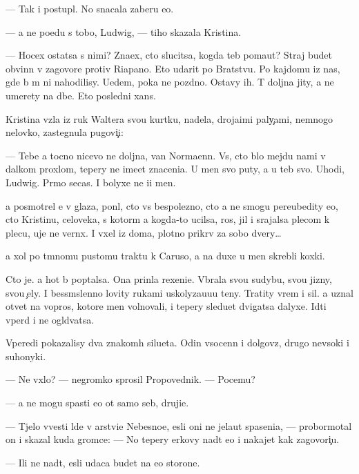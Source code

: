 \documentclass[10pt]{book}
\begin{document}
— Tak i postupl{\io}. No snacala zaberu {\y}e{\y}o.

— {\Y}a ne po{\y}edu s tobo{\y}, Ludwig, — tiho skazala Kristina.

— Hocex ostatsa s nimi? Zna{\y}ex, cto slucitsa, kogda teb{\ia} po{\y}ma{\y}ut? Straj budet obvin{\e}n v zagovore protiv Riapano. Eto udarit po Bratstvu. Po kajdomu iz nas, gde b{\yi} m{\yi} ni nahodilisy. U{\y}edem, poka ne pozdno. Ostavy ih. T{\yi} doljna jity, a ne umerety na d{\yi}be. Eto posledni{\y} xans.

Kristina vz{\ia}la iz ruk Waltera svo{\y}u kurtku, nadela, droja{\x}imi paly{\c}ami, nemnogo nelovko, zastegnula pugovi{\c}i:

— Tebe {\y}a tocno nicevo ne doljna, van Normaenn. Vs{\e}, cto b{\yi}lo mejdu nami v dal{\e}kom proxlom, tepery ne ime{\y}et znaceni{\y}a. U men{\ia} svo{\y} puty, a u teb{\ia} svo{\y}. Uhodi, Ludwig. Pr{\ia}mo se{\y}cas. I bolyxe ne i{\x}i men{\ia}.

{\Y}a posmotrel {\y}e{\y} v glaza, pon{\ia}l, cto vs{\e} bespolezno, cto {\y}a ne smogu pereubedity {\y}e{\y}o, cto Kristinu, celoveka, s kotor{\yi}m {\y}a kogda-to ucilsa, ros, jil i srajalsa plecom k plecu, uje ne vern{\e}x. I v{\yi}xel iz doma, plotno prikr{\yi}v za sobo{\y} dvery…

{\Y}a xol po t{\e}mnomu pustomu traktu k Caruso, a na duxe u men{\ia} skrebli koxki.

Cto je. {\Y}a hot{\ia} b{\yi} pop{\yi}talsa. Ona prin{\ia}la rexeni{\y}e. V{\yi}brala svo{\y}u sudybu, svo{\y}u jizny, svo{\y}u {\c}ely. I bessm{\yi}slenno lovity rukami uskolyza{\y}u{\x}u{\y}u teny. Tratity vrem{\ia} i sil{\yi}. {\Y}a uznal otvet{\yi} na vopros{\yi}, ko\-to\-r{\yi}\-{\y}e men{\ia} volnovali, i tepery sledu{\y}et dvigatsa dalyxe. Idti vper{\e}d i ne ogl{\ia}d{\yi}vatsa.

Vperedi pokazalisy dva znakom{\yi}h silueta. Odin v{\yi}socenn{\yi}{\y} i dolgov{\ia}z{\yi}{\y}, drugo{\y} nev{\yi}soki{\y} i suhonyki{\y}.

— Ne v{\yi}xlo? — negromko sprosil Pro\-po\-ved\-nik. — Po\-ce\-mu?

— {\Y}a ne mogu spasti {\y}e{\y}o ot samo{\y} seb{\ia}, druji{\x}e.

— T{\ia}jelo vvesti l{\io}de{\y} v {\C}arstvi{\y}e Nebesno{\y}e, {\y}esli oni ne jela{\y}ut spaseni{\y}a, — probormotal on i skazal kuda gromce: — No tepery {\C}erkovy na{\y}d{\e}t {\y}e{\y}o i nakajet kak zagovor{\x}i{\c}u.

— Ili ne na{\y}d{\e}t, {\y}esli udaca budet na {\y}e{\y}o storone.
\end{document}
